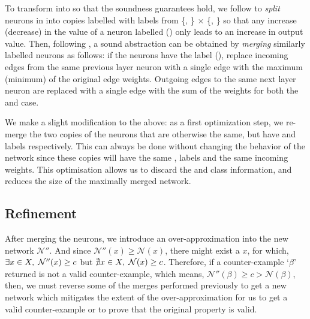 To transform \cnc into \abs so that the soundness guarantees hold, we follow
\cite{cegar-nn} to \textit{split} neurons in \cnc into copies labelled with
labels from \{\inc, \dec\} $\times$ \{\posc, \negc\} so that any
increase (decrease) in the value of a neuron labelled
\inc (\dec) only leads to an increase in output value. Then,
following \cite{cegar-nn}, a sound abstraction can be obtained by
\textit{merging} similarly labelled neurons as follows: if the neurons have the
label \inc (\dec), replace incoming edges from the same
previous layer neuron with a single edge with the maximum (minimum) of the
original edge weights. Outgoing edges to the same next layer neuron are replaced
with a single edge with the sum of the weights for both the \inc and \dec case.

We make a slight modification to the above: as a first optimization step, we
re-merge the two copies of the \abs neurons that are otherwise the same, but
have \posc and \negc labels respectively. This can always be done without
changing the behavior of the network since these copies will have the same \inc,
\dec labels and the same incoming weights.  This optimisation
allows us to discard the \posc and \negc class information, and reduces the size
of the maximally merged network.

\subsection{Refinement }



After merging the neurons, we introduce an over-approximation into 
the new network $\mathcal{N''}$. And since $\mathcal{N''}(x) \geq \mathcal{N}(x)$,
 there might exist a $x$, for which, $\exists x \in X, \hspace{1mm} \mathcal{N''}(x)
\geq c$ but $\nexists x \in X, \hspace{1mm} \mathcal{N}(x) \geq c$. 
Therefore, if a counter-example `$\beta$' returned is not a valid counter-example,
which means, $\mathcal{N''}(\beta) \geq c > \mathcal{N}(\beta)$, then, we must 
reverse some of the merges performed previously to get a new network which mitigates
the extent of the over-approximation for us to get a valid counter-example or to 
prove that the original property is valid.

